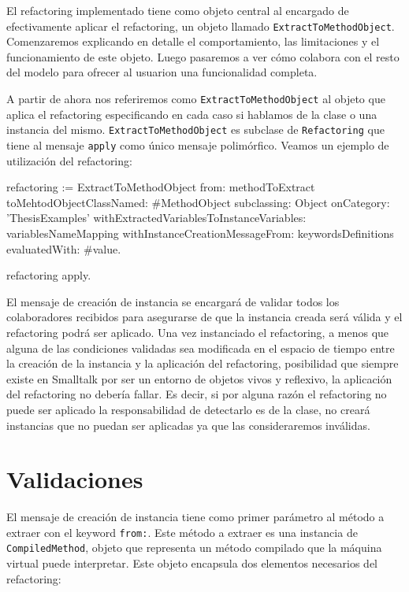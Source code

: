 El refactoring implementado tiene como objeto central al encargado de efectivamente aplicar el refactoring,
un objeto llamado \lstinline{ExtractToMethodObject}. Comenzaremos explicando en detalle el comportamiento,
las limitaciones y el funcionamiento de este objeto. Luego pasaremos a ver cómo colabora con el resto del
modelo para ofrecer al usuarion una funcionalidad completa.

A partir de ahora nos referiremos como \lstinline{ExtractToMethodObject} al objeto que aplica el refactoring
especificando en cada caso si hablamos de la clase o una instancia del mismo. \lstinline{ExtractToMethodObject} es
subclase de \lstinline{Refactoring} que tiene al mensaje \lstinline{apply} como único mensaje polimórfico.
Veamos un ejemplo de utilización del refactoring:

\begin{code}
refactoring := ExtractToMethodObject 
    from: methodToExtract
    toMehtodObjectClassNamed: #MethodObject
    subclassing: Object
    onCategory: 'ThesisExamples'
    withExtractedVariablesToInstanceVariables: variablesNameMapping
    withInstanceCreationMessageFrom: keywordsDefinitions
    evaluatedWith: #value.

refactoring apply.
\end{code}

El mensaje de creación de instancia se encargará de validar todos los colaboradores recibidos para
asegurarse de que la instancia creada será válida y el refactoring podrá ser aplicado. Una vez
instanciado el refactoring, a menos que alguna de las condiciones validadas sea modificada en el
espacio de tiempo entre la creación de la instancia y la aplicación del refactoring, posibilidad que
siempre existe en Smalltalk por ser un entorno de objetos vivos y reflexivo, la aplicación del
refactoring no debería fallar. Es decir, si por alguna razón el refactoring no puede ser aplicado la
responsabilidad de detectarlo es de la clase, no creará instancias que no puedan ser aplicadas ya
que las consideraremos inválidas.

\section{Validaciones}
El mensaje de creación de instancia tiene como primer parámetro al método a extraer con el keyword
\lstinline{from:}. Este método a extraer es una instancia de \lstinline{CompiledMethod}, objeto que 
representa un método compilado que la máquina virtual puede interpretar. Este objeto encapsula dos
elementos necesarios del refactoring:

